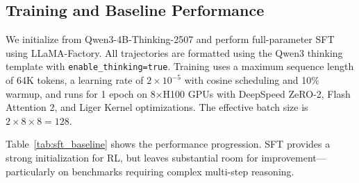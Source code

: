 \documentclass{article} %
\theoremstyle{plain}
\theoremstyle{definition}
\theoremstyle{remark}
\begin{document}
\subsection{Training and Baseline Performance}

We initialize from Qwen3-4B-Thinking-2507 and perform full-parameter SFT using LLaMA-Factory. All trajectories are formatted using the Qwen3 thinking template with \texttt{enable\_thinking=true}. Training uses a maximum sequence length of 64K tokens, a learning rate of $2 \times 10^{-5}$ with cosine scheduling and 10\% warmup, and runs for 1 epoch on 8$\times$H100 GPUs with DeepSpeed ZeRO-2, Flash Attention 2, and Liger Kernel optimizations. The effective batch size is $2 \times 8 \times 8 = 128$.

Table~\ref{tab:sft_baseline} shows the performance progression. SFT provides a strong initialization for RL, but leaves substantial room for improvement---particularly on benchmarks requiring complex multi-step reasoning.
\end{document}
